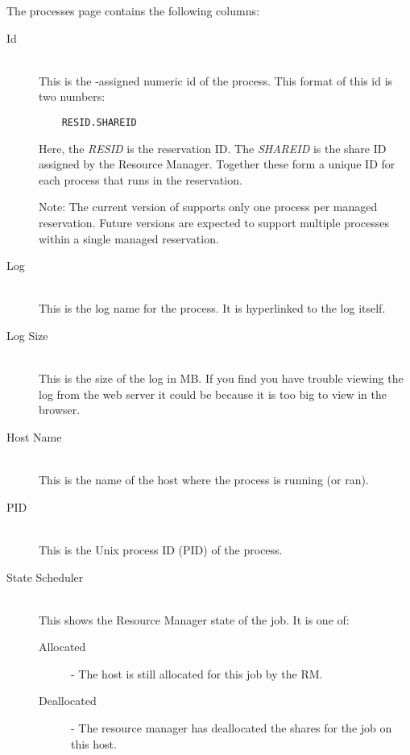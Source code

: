    The processes page contains the following columns:
   \begin{description}
      \item[Id] \hfill \\
        This is the {\DUCC}-assigned numeric id of the process.  This format of this
        id is two numbers:
\begin{verbatim}
    RESID.SHAREID
\end{verbatim}
        Here, the {\em RESID} is the reservation ID.  The {\em SHAREID} is the 
        share ID assigned by the Resource Manager.  Together these form a unique
        ID for each process that runs in the reservation.
        
        Note: The current version of {\DUCC} supports only one process per managed
        reservation.  Future versions are expected to support multiple processes
        within a single managed reservation.
        
      \item[Log] \hfill \\
        This is the log name for the process. It is hyperlinked to the log itself.
        
      \item[Log Size] \hfill \\
        This is the size of the log in MB. If you find you have trouble viewing the log
        from the web server it could be because it is too big to view in the browser.
        
      \item[Host Name] \hfill \\
        This is the name of the host where the process is running (or ran).
        
      \item[PID] \hfill \\
        This is the Unix process ID (PID) of the process.
        
      \item[State Scheduler] \hfill \\
        This shows the Resource Manager state of the job. It is one of:
        
        \begin{description}
            \item[Allocated] - The host is still allocated for this job by the RM.
            \item[Deallocated] - The resource manager has deallocated the shares for the job on
              this host.
        \end{description}
        

\end{description}
